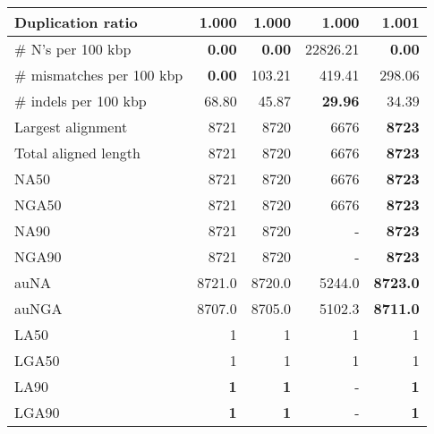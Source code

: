 \documentclass[12pt,a4paper]{article}
\begin{document}
\begin{table}[ht]
\begin{center}
\begin{tabular}{|l*{4}{|r}|}
Duplication ratio & {\bf 1.000} & {\bf 1.000} & {\bf 1.000} & 1.001 \\ \hline
\# N's per 100 kbp & {\bf 0.00} & {\bf 0.00} & 22826.21 & {\bf 0.00} \\ \hline
\# mismatches per 100 kbp & {\bf 0.00} & 103.21 & 419.41 & 298.06 \\ \hline
\# indels per 100 kbp & 68.80 & 45.87 & {\bf 29.96} & 34.39 \\ \hline
Largest alignment & 8721 & 8720 & 6676 & {\bf 8723} \\ \hline
Total aligned length & 8721 & 8720 & 6676 & {\bf 8723} \\ \hline
NA50 & 8721 & 8720 & 6676 & {\bf 8723} \\ \hline
NGA50 & 8721 & 8720 & 6676 & {\bf 8723} \\ \hline
NA90 & 8721 & 8720 & - & {\bf 8723} \\ \hline
NGA90 & 8721 & 8720 & - & {\bf 8723} \\ \hline
auNA & 8721.0 & 8720.0 & 5244.0 & {\bf 8723.0} \\ \hline
auNGA & 8707.0 & 8705.0 & 5102.3 & {\bf 8711.0} \\ \hline
LA50 & 1 & 1 & 1 & 1 \\ \hline
LGA50 & 1 & 1 & 1 & 1 \\ \hline
LA90 & {\bf 1} & {\bf 1} & - & {\bf 1} \\ \hline
LGA90 & {\bf 1} & {\bf 1} & - & {\bf 1} \\ \hline
\end{tabular}
\end{center}
\end{table}
\end{document}
